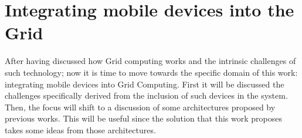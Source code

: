 \chapter{Integrating mobile devices into the Grid}
After having discussed how Grid computing works and the intrinsic challenges of such technology; now it is time to move towards the specific domain of this work: integrating mobile devices into Grid Computing. First it will be discussed the challenges specifically derived from the inclusion of such devices in the system. Then, the focus will shift to a discussion of some architectures proposed by previous works. This will be useful since the solution that this work proposes takes some ideas from those architectures.


